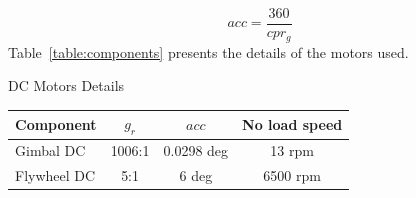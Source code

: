 \documentclass[aerospace,article,submit,moreauthors,dvi2pdf]{Definitions/mdpi}
\begin{document}
\begin{equation}
acc=\frac{360}{cpr_{g}}
\end{equation}
Table~\ref{table:components} presents the details of the motors used.
\begin{specialtable}[H] 
\caption{\label{table:components} DC Motors Details}
\begin{tabular}{lccc}
\toprule
\textbf{Component}  & $g_r$ & $acc$ & \textbf{No load speed}    \\
\midrule
Gimbal DC & 1006:1 &0.0298 deg & 13 rpm \\
Flywheel DC   & 5:1 &6 deg & 6500 rpm\\
\bottomrule
\end{tabular}
\end{specialtable}
\end{document}
